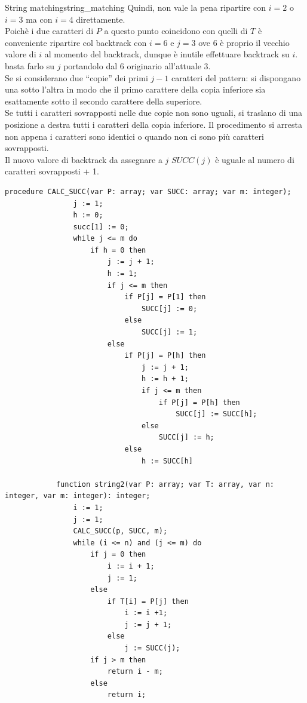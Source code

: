 \documentclass[12pt]{report}
\newcommand{\nmu}{}
\begin{document}
\begin{example}{\nmu String matching}{string_matching}
 		Quindi, non vale la pena ripartire con $i=2$ o $i=3$ ma con $i=4$ direttamente. \\
 		Poichè i due caratteri di $P$ a questo punto coincidono con quelli di $T$ è conveniente ripartire col backtrack con $i=6$ e $j=3$ ove 6 è proprio il vecchio valore di $i$ al momento del backtrack, dunque è inutile effettuare backtrack su $i$. basta farlo su $j$ portandolo dal 6 originario all'attuale 3. \\
 		Se si considerano due ``copie'' dei primi $j-1$ caratteri del pattern: si dispongano una sotto l'altra in modo che il primo carattere della copia inferiore sia esattamente sotto il secondo carattere della superiore.  \\
 		Se tutti i caratteri sovrapposti nelle due copie non sono uguali, si traslano di una posizione a destra tutti i caratteri della copia inferiore. Il procedimento si arresta non appena i caratteri sono identici o quando non ci sono più caratteri sovrapposti. \\
 		Il nuovo valore di backtrack da assegnare a $j$ $SUCC(j)$ è uguale al numero di caratteri sovrapposti + 1.
 		\begin{lstlisting}[style=pascalstyle]
 			procedure CALC_SUCC(var P: array; var SUCC: array; var m: integer);
 				j := 1;
 				h := 0;
 				succ[1] := 0;
 				while j <= m do
 					if h = 0 then
 						j := j + 1;
 						h := 1;
 						if j <= m then
 							if P[j] = P[1] then
 								SUCC[j] := 0;
 							else
 								SUCC[j] := 1;
 						else
 							if P[j] = P[h] then
 								j := j + 1;
 								h := h + 1;
 								if j <= m then
 									if P[j] = P[h] then
 										SUCC[j] := SUCC[h];
 								else
 									SUCC[j] := h;
 							else
 								h := SUCC[h]

 			function string2(var P: array; var T: array, var n: integer, var m: integer): integer;
 				i := 1;
 				j := 1;
 				CALC_SUCC(p, SUCC, m);
 				while (i <= n) and (j <= m) do
 					if j = 0 then
 						i := i + 1;
 						j := 1;
 					else
 						if T[i] = P[j] then
 							i := i +1;
 							j := j + 1;
 						else
 							j := SUCC(j);
 					if j > m then
 						return i - m;
 					else
 						return i;\end{lstlisting}
 	\end{example}
\end{document}
